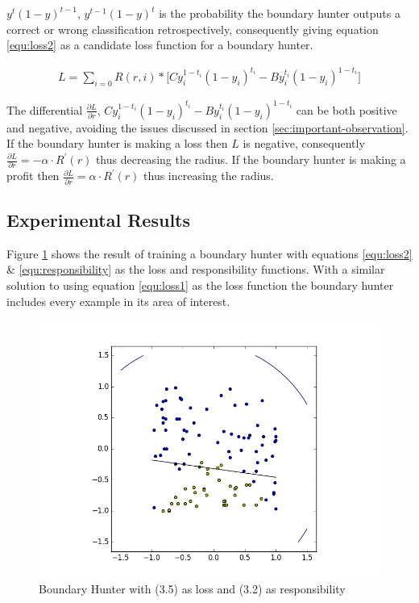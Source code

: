 \documentclass[notitlepage]{report}
\theoremstyle{definition}
\begin{document}
$y^t(1-y)^{t-1}$, $y^{t-1}(1-y)^t$ is the probability the boundary hunter outputs a correct or wrong classification retrospectively, consequently giving equation \ref{equ:loss2} as a candidate loss function for a boundary hunter.

\begin{align}
L = \sum_{i=0} R(r, i) * \big[Cy_i^{1-t_i}(1-y_i)^{t_i} - By_i^{t_i}(1-y_i)^{1-t_i} \big]
\label{equ:loss2}
\end{align}

The differential $\frac{\partial L}{\partial r}$, $Cy_i^{1-t_i}(1-y_i)^{t_i} - By_i^{t_i}(1-y_i)^{1-t_i}$ can be both positive and negative, avoiding the issues discussed in section \ref{sec:important-observation}. If the boundary hunter is making a loss then $L$ is negative, consequently $\frac{\partial L}{\partial r} = -\alpha \cdot R^{'} (r)$ thus decreasing the radius. If the boundary hunter is making a profit then $\frac{\partial L}{\partial r} = \alpha \cdot R^{'} (r)$ thus increasing the radius.

\subsection{Experimental Results}
Figure \ref{fig:boundaryhunter-l2-01} shows the result of training a boundary hunter with equations \ref{equ:loss2} \& \ref{equ:responsibility} as the loss and responsibility functions. With a similar solution to using equation \ref{equ:loss1} as the loss function the boundary hunter includes every example in its area of interest.\\

\begin{figure}[H]
\centering
  \begin{minipage}[b]{0.4\textwidth}
    \includegraphics[width=\textwidth]{BoundaryHunter-Attempt3-01.png}
    \caption{Boundary Hunter with (3.5) as loss and (3.2) as responsibility}
    \label{fig:boundaryhunter-l2-01}
  \end{minipage}
  \hfill
\end{figure}
\end{document}
